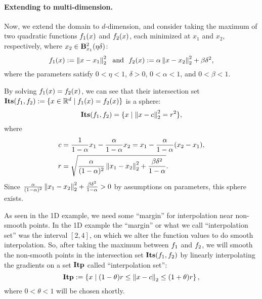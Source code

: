 \paragraph{Extending to multi-dimension.}
Now, we extend the domain to $d$-dimension, and consider taking the maximum of 
two quadratic functions $f_{1}(x)$ and $f_{2}(x)$, each minimized at $x_1$ and $x_2$, respectively, where $x_2 \in \mathbf{B}^2_{x_1}({\eta\delta})$:
\begin{equation*}
	f_{1}(x) := \left\|{x-x_1 }\right\|_2^2 ~~\text{and}~~
	f_{2}(x) := \alpha \left\|{x-x_2}\right\|_2^2 + \beta \delta^2,
\end{equation*}
where the parameters satisfy $0<\eta<1$, $\delta > 0$, $0<\alpha<1$, and $0<\beta<1$.

By solving $f_{1}(x) = f_{2}(x)$, we can see that their intersection set $\mathbf{Its}({f_{1}},{f_{2}}) := \{ x \in \mathbb{R}^d \mid f_{1}(x) = f_{2}(x)\}$ is a sphere:
\begin{equation*}
	\mathbf{Its}({f_{1}},{f_{2}}) = \{ x \mid \left\|{x-c}\right\|_2^2 = r^2 \},
\end{equation*}
where 
\begin{align}
	c &= \frac{1}{1-\alpha} x_1 - \frac{\alpha}{1-\alpha} x_2 = x_1 - \frac{\alpha}{1-\alpha} (x_2-x_1), \label{eq:defcent}\\
	r &= \sqrt{\frac{\alpha}{(1-\alpha)^2} \left\|{x_1-x_2}\right\|_2^2 + \frac{\beta\delta^2}{1-\alpha}}. \label{eq:defradi}
\end{align}
Since $\frac{\alpha}{(1-\alpha)^2} \left\|{x_1-x_2}\right\|_2^2 + \frac{\beta\delta^2}{1-\alpha} > 0$ by assumptions on parameters, this sphere exists.

As seen in the 1D example,
we need some ``margin'' for interpolation near non-smooth points.
In the 1D example the ``margin'' or what we call ``interpolation set'' was the interval $[2,4]$, on which we alter the function values to do smooth interpolation.
So, after taking the maximum between $f_{1}$ and $f_{2}$, 
we will smooth the non-smooth points in the intersection set 
$\mathbf{Its}({f_{1}},{f_{2}})$ by linearly interpolating the gradients
on a set $\mathbf{Itp}$ called ``interpolation set'':
\begin{equation*}
	\mathbf{Itp} := \left \{ x \mid (1-\theta)r \leq \left\|{x-c}\right\|_2 \leq (1+\theta)r \right \},
\end{equation*}
where $0<\theta<1$ will be chosen shortly.

